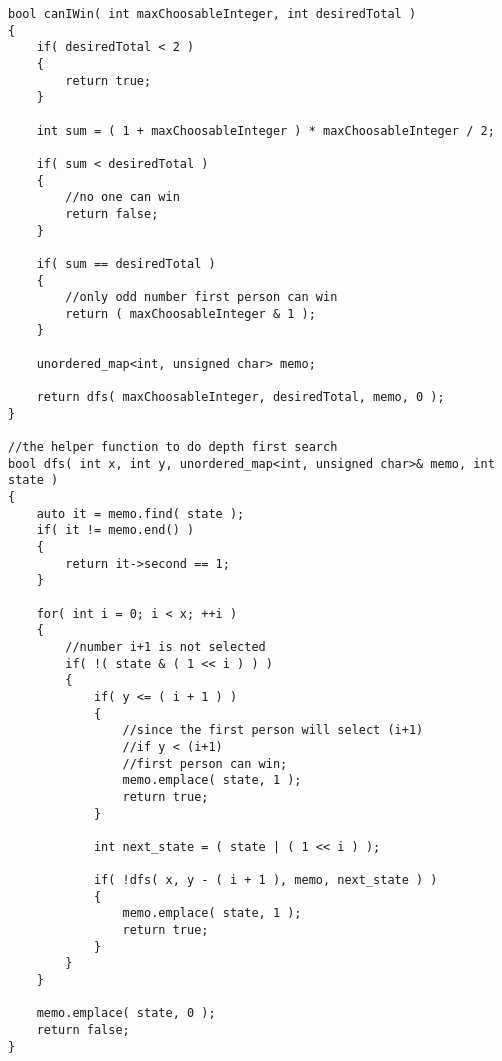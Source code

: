 \setcounter{lstlisting}{0}
\begin{lstlisting}[style=customc, caption={Depth First Search}]
bool canIWin( int maxChoosableInteger, int desiredTotal )
{
    if( desiredTotal < 2 )
    {
        return true;
    }

    int sum = ( 1 + maxChoosableInteger ) * maxChoosableInteger / 2;

    if( sum < desiredTotal )
    {
        //no one can win
        return false;
    }

    if( sum == desiredTotal )
    {
        //only odd number first person can win
        return ( maxChoosableInteger & 1 );
    }

    unordered_map<int, unsigned char> memo;

    return dfs( maxChoosableInteger, desiredTotal, memo, 0 );
}

//the helper function to do depth first search
bool dfs( int x, int y, unordered_map<int, unsigned char>& memo, int state )
{
    auto it = memo.find( state );
    if( it != memo.end() )
    {
        return it->second == 1;
    }

    for( int i = 0; i < x; ++i )
    {
        //number i+1 is not selected
        if( !( state & ( 1 << i ) ) )
        {
            if( y <= ( i + 1 ) )
            {
                //since the first person will select (i+1)
                //if y < (i+1)
                //first person can win;
                memo.emplace( state, 1 );
                return true;
            }

            int next_state = ( state | ( 1 << i ) );

            if( !dfs( x, y - ( i + 1 ), memo, next_state ) )
            {
                memo.emplace( state, 1 );
                return true;
            }
        }
    }

    memo.emplace( state, 0 );
    return false;
}
\end{lstlisting}
